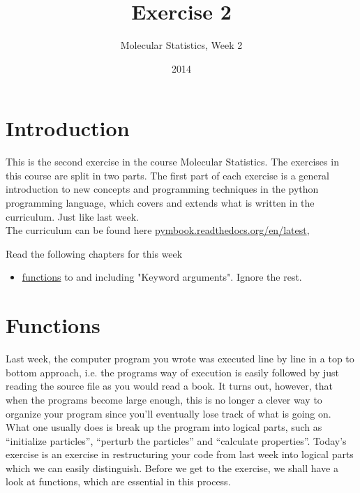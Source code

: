 \documentclass{article}
\title{Exercise 2}
\author{Molecular Statistics, Week 2}
\date{2014}
\begin{document}

\maketitle

\section{Introduction}

This is the second exercise in the course Molecular Statistics.
%
The exercises
in this course are split in two parts. The first part of each exercise is a
general introduction to new concepts and programming techniques in the python
programming language, which covers and extends what is written in the
curriculum.
Just like last week.\\

The curriculum can be found here 
\href{http://pymbook.readthedocs.org/en/latest/}{pymbook.readthedocs.org/en/latest},

Read the following chapters for this week

\begin{itemize}
    \item \href{http://pymbook.readthedocs.org/en/latest/functions.html}{functions} 
          \newline to and including "Keyword arguments". Ignore the rest.
\end{itemize}


\section{Functions}

Last week, the computer program you wrote was executed line by line in a top to
bottom approach, i.e. the programs way of execution is easily followed by just
reading the source file as you would read a book. It turns out, however, that
when the programs become large enough, this is no longer a clever way to organize
your program since you'll eventually lose track of what is going on. What one
usually does is break up the program into logical parts, such as “initialize
particles”, “perturb the particles” and “calculate properties”. Today's
exercise is an exercise in restructuring your code
from last week into logical parts which we can easily distinguish. Before we
get to the exercise, we shall have a look at functions, which are
essential in this process.\\
\end{document}
